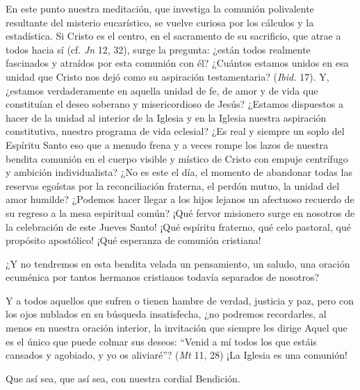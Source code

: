 			\begin{body}En este punto nuestra meditación, que investiga la comunión polivalente resultante del misterio eucarístico, se vuelve curiosa por los cálculos y la estadística. Si Cristo es el centro, en el sacramento de su sacrificio, que atrae a todos hacia sí (cf. \textit{Jn} 12, 32), surge la pregunta: ¿están todos realmente fascinados y atraídos por esta comunión con él? ¿Cuántos estamos unidos en esa unidad que Cristo nos dejó como su aspiración testamentaria? (\textit{Ibid. }17). Y, ¿estamos verdaderamente en aquella unidad de fe, de amor y de vida que constituían el deseo soberano y misericordioso de Jesús? ¿Estamos dispuestos a hacer de la unidad al interior de la Iglesia y en la Iglesia nuestra aspiración constitutiva, nuestro programa de vida eclesial? ¿Es real y siempre un soplo del Espíritu Santo eso que a menudo frena y a veces rompe los lazos de nuestra bendita comunión en el cuerpo visible y místico de Cristo con empuje centrífugo y ambición individualista? ¿No es este el día, el momento de abandonar todas las reservas egoístas por la reconciliación fraterna, el perdón mutuo, la unidad del amor humilde? ¿Podemos hacer llegar a los hijos lejanos un afectuoso recuerdo de su regreso a la mesa espiritual común? ¡Qué fervor misionero surge en nosotros de la celebración de este Jueves Santo! ¡Qué espíritu fraterno, qué celo pastoral, qué propósito apostólico! ¡Qué esperanza de comunión cristiana!\end{body}
			
			\begin{body}¿Y no tendremos en esta bendita velada un pensamiento, un saludo, una oración ecuménica por tantos hermanos cristianos todavía separados de nosotros? \end{body}
			
			\begin{body}Y a todos aquellos que sufren o tienen hambre de verdad, justicia y paz, pero con los ojos nublados en su búsqueda insatisfecha, ¿no podremos recordarles, al menos en nuestra oración interior, la invitación que siempre les dirige Aquel que es el único que puede colmar sus deseos: “Venid a mí todos los que estáis cansados y agobiado, y yo os aliviaré”? (\textit{Mt }11, 28) ¡La Iglesia es una comunión!\end{body}
			
			\begin{body}Que así sea, que así sea, con nuestra cordial Bendición.\end{body}
			

